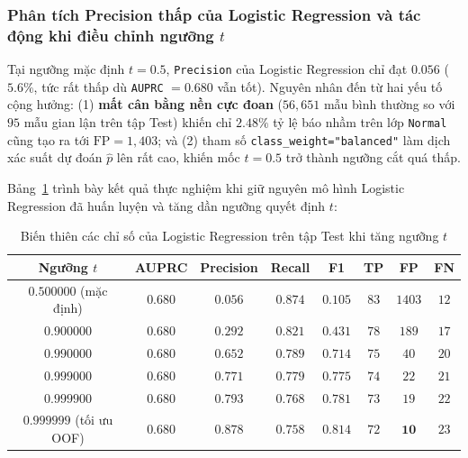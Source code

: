 \subsubsection{Phân tích Precision thấp của Logistic Regression và tác động khi điều chỉnh ngưỡng $t$}

Tại ngưỡng mặc định $t = 0.5$, \texttt{Precision} của Logistic Regression chỉ đạt $0.056$ ($5.6\%$, tức rất thấp dù \texttt{AUPRC} $= 0.680$ vẫn tốt). Nguyên nhân đến từ hai yếu tố cộng hưởng: (1) \textbf{mất cân bằng nền cực đoan} ($56{,}651$ mẫu bình thường so với $95$ mẫu gian lận trên tập Test) khiến chỉ $2.48\%$ tỷ lệ báo nhầm trên lớp \texttt{Normal} cũng tạo ra tới $\text{FP} = 1{,}403$; và (2) tham số \texttt{class\_weight="balanced"} làm dịch xác suất dự đoán $\hat{p}$ lên rất cao, khiến mốc $t = 0.5$ trở thành ngưỡng cắt quá thấp.

Bảng~\ref{tab:lr_threshold_sweep} trình bày kết quả thực nghiệm khi giữ nguyên mô hình Logistic Regression đã huấn luyện và tăng dần ngưỡng quyết định $t$:

\begin{table}[H]
\centering
\caption{Biến thiên các chỉ số của Logistic Regression trên tập Test khi tăng ngưỡng $t$}
\label{tab:lr_threshold_sweep}
\renewcommand{\arraystretch}{1.2}
\begin{tabular}{|c|c|c|c|c|c|c|c|}
\hline
\textbf{Ngưỡng $t$} & \textbf{AUPRC} & \textbf{Precision} & \textbf{Recall} & \textbf{F1} & \textbf{TP} & \textbf{FP} & \textbf{FN} \\
\hline
$0.500000$ (mặc định) & $0.680$ & $0.056$ & $\mathbf{0.874}$ & $0.105$ & $83$ & $1403$ & $12$ \\
\hline
$0.900000$ & $0.680$ & $0.292$ & $0.821$ & $0.431$ & $78$ & $189$ & $17$ \\
\hline
$0.990000$ & $0.680$ & $0.652$ & $0.789$ & $0.714$ & $75$ & $40$ & $20$ \\
\hline
$0.999000$ & $0.680$ & $0.771$ & $0.779$ & $0.775$ & $74$ & $22$ & $21$ \\
\hline
$0.999900$ & $0.680$ & $0.793$ & $0.768$ & $0.781$ & $73$ & $19$ & $22$ \\
\hline
$0.999999$ (tối ưu OOF) & $0.680$ & $\mathbf{0.878}$ & $0.758$ & $\mathbf{0.814}$ & $72$ & $\mathbf{10}$ & $23$ \\
\hline
\end{tabular}
\end{table}

